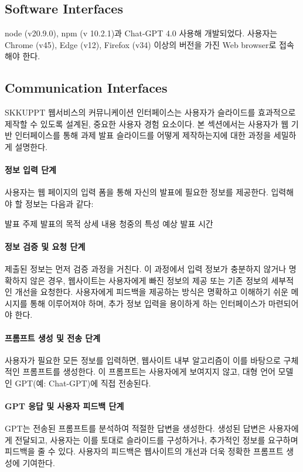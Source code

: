 \documentclass[a4paper, 12pt]{article}
\begin{document}
\subsection{Software Interfaces}

node (v20.9.0), npm (v 10.2.1)과 Chat-GPT 4.0 사용해 개발되었다. 사용자는 Chrome (v45), Edge (v12), Firefox (v34) 이상의 버전을 가진 Web browser로 접속해야 한다.

\subsection{Communication Interfaces}

SKKUPPT 웹서비스의 커뮤니케이션 인터페이스는 사용자가 슬라이드를 효과적으로 제작할 수 있도록 설계된, 중요한 사용자 경험 요소이다. 본 섹션에서는 사용자가 웹 기반 인터페이스를 통해 과제 발표 슬라이드를 어떻게 제작하는지에 대한 과정을 세밀하게 설명한다.

\paragraph{정보 입력 단계}
사용자는 웹 페이지의 입력 폼을 통해 자신의 발표에 필요한 정보를 제공한다. 입력해야 할 정보는 다음과 같다:

발표 주제
발표의 목적
상세 내용
청중의 특성
예상 발표 시간
\paragraph{정보 검증 및 요청 단계}
제출된 정보는 먼저 검증 과정을 거친다. 이 과정에서 입력 정보가 충분하지 않거나 명확하지 않은 경우, 웹사이트는 사용자에게 빠진 정보의 제공 또는 기존 정보의 세부적인 개선을 요청한다. 사용자에게 피드백을 제공하는 방식은 명확하고 이해하기 쉬운 메시지를 통해 이루어져야 하며, 추가 정보 입력을 용이하게 하는 인터페이스가 마련되어야 한다.

\paragraph{프롬프트 생성 및 전송 단계}
사용자가 필요한 모든 정보를 입력하면, 웹사이트 내부 알고리즘이 이를 바탕으로 구체적인 프롬프트를 생성한다. 이 프롬프트는 사용자에게 보여지지 않고, 대형 언어 모델인 GPT(예: Chat-GPT)에 직접 전송된다.

\paragraph{GPT 응답 및 사용자 피드백 단계}
GPT는 전송된 프롬프트를 분석하여 적절한 답변을 생성한다. 생성된 답변은 사용자에게 전달되고, 사용자는 이를 토대로 슬라이드를 구성하거나, 추가적인 정보를 요구하며 피드백을 줄 수 있다. 사용자의 피드백은 웹사이트의 개선과 더욱 정확한 프롬프트 생성에 기여한다.
\end{document}

